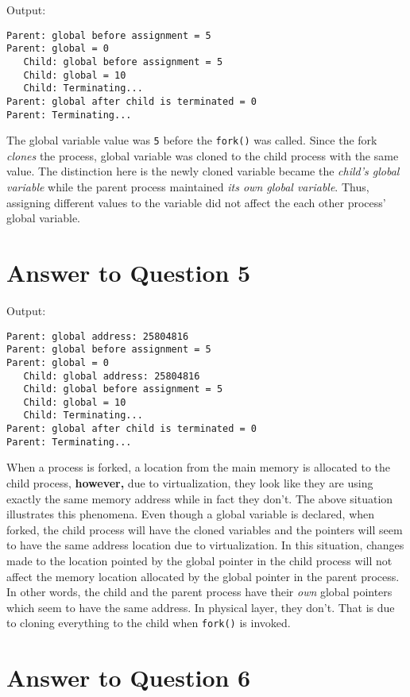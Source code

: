 \documentclass{article}
\begin{document}
Output:

\begin{lstlisting}
Parent: global before assignment = 5
Parent: global = 0
   Child: global before assignment = 5
   Child: global = 10
   Child: Terminating...
Parent: global after child is terminated = 0
Parent: Terminating...
\end{lstlisting}

The global variable value was \texttt{5} before the \texttt{fork()} was called. Since the fork \emph{clones} the process, global variable was
cloned to the child process with the same value. The distinction here is the newly cloned variable became the \emph{child's global variable} while the 
parent process maintained \emph{its own global variable}. Thus, assigning different values to the variable did not affect the each other process' 
global variable.

\section{Answer to Question 5}

Output:

\begin{lstlisting}
Parent: global address: 25804816
Parent: global before assignment = 5
Parent: global = 0
   Child: global address: 25804816
   Child: global before assignment = 5
   Child: global = 10
   Child: Terminating...
Parent: global after child is terminated = 0
Parent: Terminating...
\end{lstlisting}

When a process is forked, a location from the main memory is allocated to the child process, \textbf{however,} due to virtualization, they look like
they are using exactly the same memory address while in fact they don't. The above situation illustrates this phenomena. Even though a global variable is
declared, when forked, the child process will have the cloned variables and the pointers will seem to have the same address location due to
virtualization. In this situation, changes made to the location pointed by the global pointer in the child process will not affect the memory location 
allocated by the global pointer in the parent process. In other words, the child and the parent process have their \emph{own} global pointers which seem
to have the same address. In physical layer, they don't. That is due to cloning everything to the child when \texttt{fork()} is invoked.  

\newpage
\section{Answer to Question 6}
\end{document}
